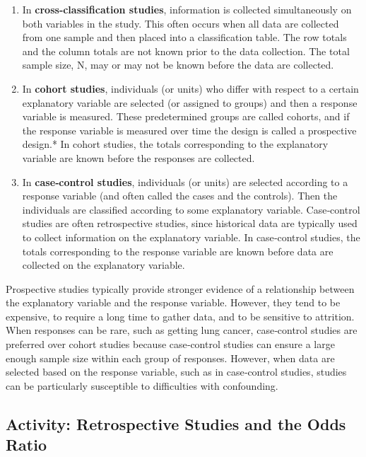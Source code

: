 \documentclass[
]{book}
\begin{document}
\begin{enumerate}
\def\labelenumi{\arabic{enumi}.}
\item
  In \textbf{cross‑classification studies}, information is collected simultaneously on both variables in the study. This often occurs when all data are collected from one sample and then placed into a classification table. The row totals and the column totals are not known prior to the data collection. The total sample size, N, may or may not be known before the data are collected.
\item
  In \textbf{cohort studies}, individuals (or units) who differ with respect to a certain explanatory variable are selected (or assigned to groups) and then a response variable is measured. These predetermined groups are called cohorts, and if the response variable is measured over time the design is called a prospective design.* In cohort studies, the totals corresponding to the explanatory variable are known before the responses are collected.
\item
  In \textbf{case‑control studies}, individuals (or units) are selected according to a response variable (and often called the cases and the controls). Then the individuals are classified according to some explanatory variable. Case‑control studies are often retrospective studies, since historical data are typically used to collect information on the explanatory variable. In case‑control studies, the totals corresponding to the response variable are known before data are collected on the explanatory variable.
\end{enumerate}

Prospective studies typically provide stronger evidence of a relationship between the explanatory variable and the response variable. However, they tend to be expensive, to require a long time to gather data, and to be sensitive to attrition. When responses can be rare, such as getting lung cancer, case‑control studies are preferred over cohort studies because case‑control studies can ensure a large enough sample size within each group of responses. However, when data are selected based on the response variable, such as in case‑control studies, studies can be particularly susceptible to difficulties with confounding.

\hypertarget{activity-retrospective-studies-and-the-odds-ratio}{%
\subsection*{Activity: Retrospective Studies and the Odds Ratio}\label{activity-retrospective-studies-and-the-odds-ratio}}
\end{document}
